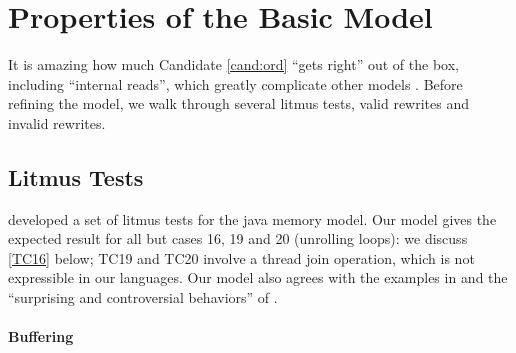 \section{Properties of the Basic Model}
\label{sec:props}

It is amazing how much Candidate \ref{cand:ord} ``gets right'' out of the
box, including ``internal reads'', which greatly complicate other models
\cite{DBLP:journals/pacmpl/PulteFDFSS18}.  Before refining the model, we walk
through several litmus tests, valid rewrites and invalid rewrites.

\subsection{Litmus Tests}
\label{sec:litmus}




\citet{PughWebsite} developed a set of litmus tests for the java memory
model.  Our model gives the expected result for all but cases 16, 19 and 20
(unrolling loops): we discuss \ref{TC16} below; TC19 and TC20 involve a
thread join operation, which is not expressible in our languages.  Our model
also agrees with the \oota{} examples in \citet[]{DBLP:conf/esop/BattyMNPS15} and the ``surprising and controversial
behaviors'' of \citet[]{Manson:2005:JMM:1047659.1040336}.

\paragraph{Buffering}

